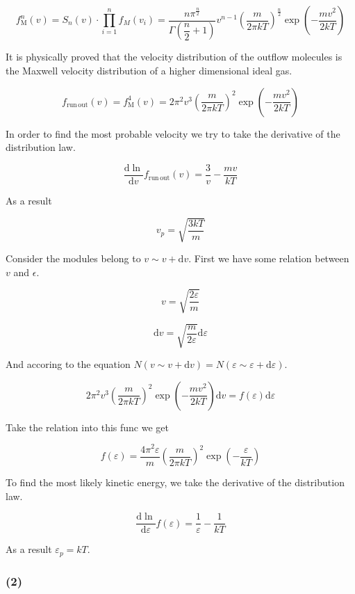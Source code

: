 \documentclass[a4paper,11pt]{amsart}
\theoremstyle{definition}
\begin{document}
	$$
	f_{\mathrm{M}}^{n}\left( v \right) =S_n\left( v \right) \cdot \prod_{i=1}^n{f_M\left( v_i \right)}=\frac{n\pi ^{\tfrac{n}{2}}}{\Gamma \left( \dfrac{n}{2}+1 \right)}v^{n-1}\left( \frac{m}{2\pi kT} \right) ^{\tfrac{n}{2}}\exp \left( -\frac{mv^2}{2kT} \right) 
	$$

	It is physically proved that the velocity distribution of the outflow molecules is the Maxwell velocity distribution of a higher dimensional ideal gas.

	$$
	f_{\mathrm{run}\,\mathrm{out}}\left( v \right) =f_{\mathrm{M}}^{4}\left( v \right) =2\pi ^2v^3\left( \frac{m}{2\pi kT} \right) ^2\exp \left( -\frac{mv^2}{2kT} \right) 
	$$

	In order to find the most probable velocity we try to take the derivative of the distribution law.

	$$
	\frac{\mathrm{d}\ln}{\mathrm{d}v}f_{\mathrm{run}\,\mathrm{out}}\left( v \right) =\frac{3}{v}-\frac{mv}{kT}
	$$

	As a result

	$$
	v_p=\sqrt{\dfrac{3kT}{m}}
	$$
	
	Consider the modules belong to $v\sim v+\mathrm{d}v$. First we have some relation between $v$ and $\epsilon$.
	
	$$
	v=\sqrt{\dfrac{2\varepsilon}{m}}
	$$
	
	$$
	\mathrm{d}v=\sqrt{\dfrac{m}{2\varepsilon}}\mathrm{d}\varepsilon
	$$
	
	And accoring to the equation $N(v\sim v+\mathrm{d}v)=N(\varepsilon\sim\varepsilon+\mathrm{d}\varepsilon)$.
	
	$$
	2\pi ^2v^3\left( \frac{m}{2\pi kT} \right) ^2\exp \left( -\frac{mv^2}{2kT} \right) \mathrm{d}v=f\left( \varepsilon \right) \mathrm{d}\varepsilon 
	$$
	
	Take the relation into this func we get
	
	$$
	f\left( \varepsilon \right) =\frac{4\pi ^2\varepsilon}{m}\left( \frac{m}{2\pi kT} \right) ^2\exp \left( -\frac{\varepsilon}{kT} \right) 
	$$
	
	To find the most likely kinetic energy, we take the derivative of the distribution law.
	
	$$
	\frac{\mathrm{d}\ln}{\mathrm{d}\varepsilon}f\left( \varepsilon \right) =\frac{1}{\varepsilon}-\frac{1}{kT}
	$$
	
	As a result $\varepsilon_p=kT$.
	
	\subsubsection*{(2)}
	
\end{document}
